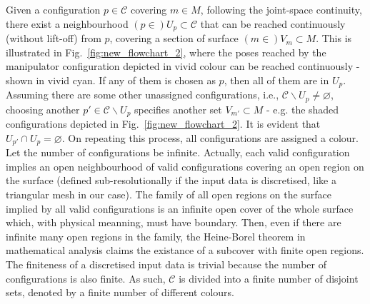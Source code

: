 \documentclass[journal]{IEEEtran}
\begin{document}
Given a configuration $p \in \mathscr{C}$ covering $m\in M$, following the joint-space continuity, there exist a neighbourhood $(p\in)U_p\subset \mathscr{C}$ that can be reached continuously (without lift-off) from $p$, covering a section of surface 
$(m\in )V_{m}\subset M$. This is illustrated in Fig.~\ref{fig:new_flowchart_2}, where the poses reached by the manipulator 
configuration depicted in vivid colour can be reached continuously - shown in vivid cyan. 
If any of them is chosen as $p$, then all of them are in $U_p$. 
Assuming there are some other unassigned configurations, i.e., $\mathscr{C}\backslash U_p\neq \varnothing$, 
choosing another  $p'\in \mathscr{C}\backslash U_p$ specifies another set $V_{m'}\subset M$ - e.g. the shaded 
configurations depicted in Fig.~\ref{fig:new_flowchart_2}. 
It is evident that $U_{p'} \cap U_{p} = \varnothing$. %
On repeating this process, all configurations are assigned a colour. 
Let the number of configurations be infinite. Actually, each valid configuration implies an open neighbourhood of valid configurations covering an open region on the surface (defined sub-resolutionally if the input data is discretised, like a triangular mesh in our case). The family of all open regions on the surface implied by all valid configurations is an infinite open cover of the whole surface which, with physical meanning, must have boundary. Then, even if there are infinite many open regions in the family, the Heine-Borel theorem in mathematical analysis claims the existance of a subcover with finite open regions. The finiteness of a discretised input data is trivial because the number of configurations is also finite.
As such, $\mathscr{C}$ is divided into a finite number of disjoint sets, denoted by a finite number of different colours. 
\end{document}
